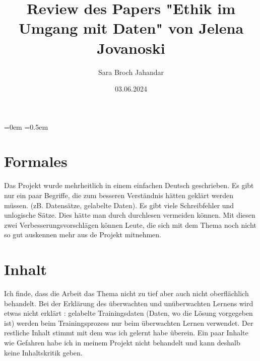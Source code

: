 \documentclass{article}
\title{Review des Papers "Ethik im Umgang mit Daten" von Jelena Jovanoski}
\author{Sara Broch Jahandar}
\date{03.06.2024}
\begin{document}
\parindent=0em
\parskip=0.5em
\maketitle

\section{Formales}
Das Projekt wurde mehrheitlich in einem einfachen Deutsch geschrieben. Es gibt nur ein paar Begriffe, die zum besseren Verständnis 
hätten geklärt werden müssen. (zB. Datensätze, gelabelte Daten).
Es gibt viele Schreibfehler und unlogische Sätze. Dies hätte man durch durchlesen 
vermeiden können.
Mit diesen zwei Verbesserungsvorschlägen können Leute, die sich mit dem Thema noch nicht so gut auskennen mehr aus de Projekt
mitnehmen.

\section{Inhalt}
Ich finde, dass die Arbeit das Thema nicht zu tief aber auch nicht oberflächlich behandelt.
Bei der Erklärung des überwachten und unüberwachten Lernens wird etwas nicht erklärt : gelabelte Trainingsdaten (Daten, wo die Lösung vorgegeben ist)
werden beim Trainingsprozess nur beim überwachten Lernen verwendet. \citep{bigdatainsider}
Der restliche Inhalt stimmt mit dem was ich gelernt habe überein. Ein paar Inhalte wie Gefahren habe ich in meinem Projekt nicht behandelt
und kann deshalb keine Inhaltskritik geben.
\printbibliography
\end{document}
